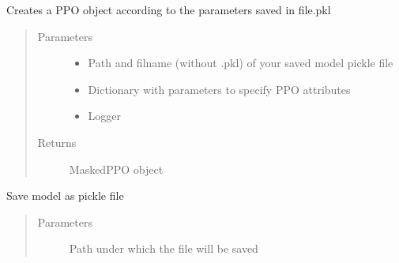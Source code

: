 \documentclass[letterpaper,10pt,english]{sphinxmanual}
\begin{document}
\begin{fulllineitems}
\begin{fulllineitems}
\label{\detokenize{agents.reinforcement_learning:agents.reinforcement_learning.ppo_masked.MaskedPPO.load}}
\sphinxAtStartPar
Creates a PPO object according to the parameters saved in file.pkl
\begin{quote}\begin{description}
\item[{Parameters}] \leavevmode\begin{itemize}
\item {} 
\sphinxAtStartPar
{} \textendash{} Path and filname (without .pkl) of your saved model pickle file

\item {} 
\sphinxAtStartPar
{} \textendash{} Dictionary with parameters to specify PPO attributes

\item {} 
\sphinxAtStartPar
{} \textendash{} Logger

\end{itemize}

\item[{Returns}] \leavevmode
\sphinxAtStartPar
MaskedPPO object

\end{description}\end{quote}

\end{fulllineitems}


\begin{fulllineitems}
\label{\detokenize{agents.reinforcement_learning:agents.reinforcement_learning.ppo_masked.MaskedPPO.save}}
\sphinxAtStartPar
Save model as pickle file
\begin{quote}\begin{description}
\item[{Parameters}] \leavevmode
\sphinxAtStartPar
{} \textendash{} Path under which the file will be saved


\end{description}
\end{quote}
\end{fulllineitems}
\end{fulllineitems}
\end{document}
